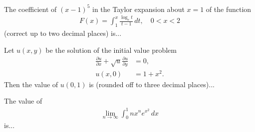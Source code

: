 \item The coefficient of \((x-1)^5\) in the Taylor expansion about \(x = 1\) of the function
\begin{align*}
    F(x) = \int_1^x \frac{\log_e t}{t-1} \, dt, \quad 0 < x < 2 
\end{align*}
(correct up to two decimal places) is...

\item Let \(u(x, y)\) be the solution of the initial value problem 
\begin{align*}
\frac{\partial u}{\partial x} + \sqrt{u} \frac{\partial u}{\partial y} &= 0, \\
u(x, 0) &= 1 + x^2.
\end{align*}
Then the value of \(u(0, 1)\) is (rounded off to three decimal places)...

\item The value of 
\begin{align*}
\lim_{n \to \infty} \int_0^1 nx^n e^{x^2} \, dx
\end{align*}
is...

